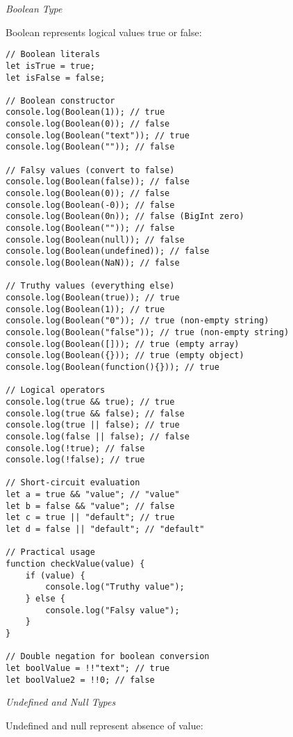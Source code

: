 \documentclass[12pt,a4paper,oneside]{book}
\newcommand{\mysubsubsection}[1]{%
    \vspace{0.1em}
    {\normalsize\itshape #1}
    \vspace{0.1em}
}
\begin{document}
\mysubsubsection{Boolean Type}

Boolean represents logical values true or false:

\begin{lstlisting}[style=javascript, caption={\textbf{Boolean Type and Truthy/Falsy Values}}, label=lst:boolean-type]
// Boolean literals
let isTrue = true;
let isFalse = false;

// Boolean constructor
console.log(Boolean(1)); // true
console.log(Boolean(0)); // false
console.log(Boolean("text")); // true
console.log(Boolean("")); // false

// Falsy values (convert to false)
console.log(Boolean(false)); // false
console.log(Boolean(0)); // false
console.log(Boolean(-0)); // false
console.log(Boolean(0n)); // false (BigInt zero)
console.log(Boolean("")); // false
console.log(Boolean(null)); // false
console.log(Boolean(undefined)); // false
console.log(Boolean(NaN)); // false

// Truthy values (everything else)
console.log(Boolean(true)); // true
console.log(Boolean(1)); // true
console.log(Boolean("0")); // true (non-empty string)
console.log(Boolean("false")); // true (non-empty string)
console.log(Boolean([])); // true (empty array)
console.log(Boolean({})); // true (empty object)
console.log(Boolean(function(){})); // true

// Logical operators
console.log(true && true); // true
console.log(true && false); // false
console.log(true || false); // true
console.log(false || false); // false
console.log(!true); // false
console.log(!false); // true

// Short-circuit evaluation
let a = true && "value"; // "value"
let b = false && "value"; // false
let c = true || "default"; // true
let d = false || "default"; // "default"

// Practical usage
function checkValue(value) {
    if (value) {
        console.log("Truthy value");
    } else {
        console.log("Falsy value");
    }
}

// Double negation for boolean conversion
let boolValue = !!"text"; // true
let boolValue2 = !!0; // false
\end{lstlisting}

\mysubsubsection{Undefined and Null Types}

Undefined and null represent absence of value:
\end{document}
